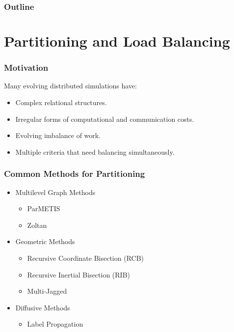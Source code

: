 \documentclass{beamer}
\begin{document}
\begin{frame}
  \frametitle{Outline}
  \tableofcontents
\end{frame}

\section{Partitioning and Load Balancing}
\begin{frame}
  \frametitle{Motivation}
  Many evolving distributed simulations have: \\
  \begin{itemize}
    \item Complex relational structures.


    \item Irregular forms of computational and communication costs.
    \item Evolving imbalance of work. %
    \item Multiple criteria that need balancing simultaneously.
  \end{itemize}
\end{frame}

\begin{frame}
  \frametitle{Common Methods for Partitioning}
  \begin{itemize}
  \item Multilevel Graph Methods %
    \begin{itemize}
    \item ParMETIS
    \item Zoltan
    \end{itemize}
  \item Geometric Methods %
    \begin{itemize}
    \item Recursive Coordinate Bisection (RCB)
    \item Recursive Inertial Bisection (RIB)
    \item Multi-Jagged
    \end{itemize}
  \item Diffusive Methods %
    \begin{itemize}
    \item Label Propagation
    \end{itemize}
  \end{itemize}
\end{frame}
\end{document}
